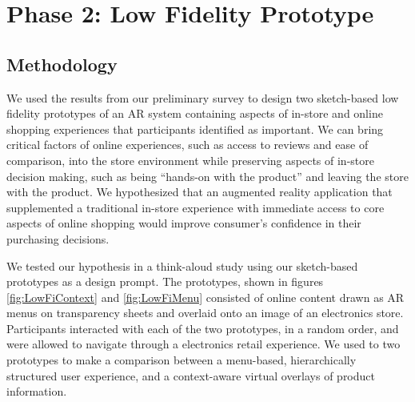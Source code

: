 \section{Phase 2: Low Fidelity Prototype}
\subsection{Methodology}
We used the results from our preliminary survey to design two sketch-based low fidelity prototypes of an AR system containing aspects of in-store and online shopping experiences that participants identified as important.  We can bring critical factors of online experiences, such as access to reviews and ease of comparison, into the store environment while preserving aspects of in-store decision making, such as being ``hands-on with the product'' and leaving the store with the product. We hypothesized that an augmented reality application that supplemented a traditional in-store experience with immediate access to core aspects of online shopping would improve consumer's confidence in their purchasing decisions. 

We tested our hypothesis in a think-aloud study using our sketch-based prototypes as a design prompt.  The prototypes, shown in figures \ref{fig:LowFiContext} and \ref{fig:LowFiMenu} consisted of online content drawn as AR menus on transparency sheets and overlaid onto an image of an electronics store. Participants interacted with each of the two prototypes, in a random order, and were allowed to navigate through a electronics retail experience. We used to two prototypes to make a comparison between a menu-based, hierarchically structured user experience, and a context-aware virtual overlays of product information.  

